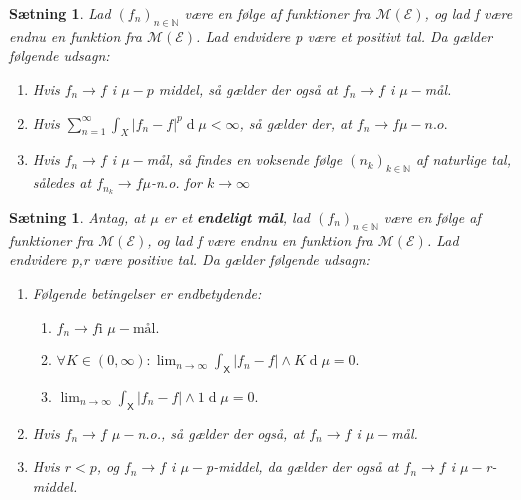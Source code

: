 \documentclass{article}
\newcommand{\N}{\mathbb{N}}
\newcommand{\1}{\mathbbm{1}}
\newcommand{\X}{\mathsf{X}}
\newcommand{\deriv}{\operatorname{d}}
\theoremstyle{boxed}
\newtheorem{proposition}[theorem]{Sætning}
\begin{document}
\begin{theorem-box}
    \begin{proposition}
        Lad $(f_n)_{n\in\N}$ være en følge af funktioner fra $\mathcal{M}(\mathcal{E})$, og lad f være endnu en funktion fra $\mathcal{M}(\mathcal{E})$. Lad endvidere p være et positivt tal. Da gælder følgende udsagn:
        \begin{enumerate}
            \item[\textnormal{(i)}] Hvis $f_n\rightarrow f$ i $\mu-p$ middel, så gælder der også at $f_n\rightarrow f$ i $\mu-$mål.
            \item[\textnormal{(ii)}] Hvis $\sum_{n=1}^\infty\int_X|f_n-f|^p\deriv\mu<\infty$, så gælder der, at $f_n\rightarrow f \mu-n.o.$
            \item[\textnormal{(iii)}] Hvis $f_n\rightarrow f$ i $\mu-$mål, så findes en voksende følge $(n_k)_{k\in\N}$ af naturlige tal, således at $f_{n_k}\rightarrow f \mu$-n.o. for $k\rightarrow \infty$ 
        \end{enumerate}
    \end{proposition}
\end{theorem-box}
\begin{theorem-box}
    \begin{proposition}
        Antag, at $\mu$ er et \textbf{endeligt mål}, lad $(f_n)_{n\in\N}$ være en følge af funktioner fra $\mathcal{M}(\mathcal{E})$, og lad f være endnu en funktion fra $\mathcal{M}(\mathcal{E})$. Lad endvidere p,r være positive tal. Da gælder følgende udsagn:
        \begin{enumerate}
            \item[\textnormal{(i)}] Følgende betingelser er endbetydende:
            \begin{enumerate}
                \item[\textnormal{(i1)}] $f_n \rightarrow f \text{i }\mu-\text{mål}.$
                \item[\textnormal{(i2)}] $\forall K\in(0,\infty):\lim_{n\rightarrow\infty}\int_\X|f_n-f| \wedge K \deriv \mu = 0.$
                \item[\textnormal{(i3)}] $\lim_{n\rightarrow \infty}\int_{\X}|f_n-f|\wedge 1 \deriv \mu = 0.$ 
            \end{enumerate}
            \item[\textnormal{(ii)}] Hvis $f_n\rightarrow f$ $\mu-$n.o., så gælder der også, at $f_n\rightarrow f$ i $\mu-$mål.
            \item[\textnormal{(iii)}] Hvis $r<p$, og $f_n\rightarrow f$ i $\mu-$p-middel, da gælder der også at $f_n\rightarrow f$ i $\mu-$r-middel.
            \end{enumerate}
    \end{proposition}
\end{theorem-box}
\end{document}
